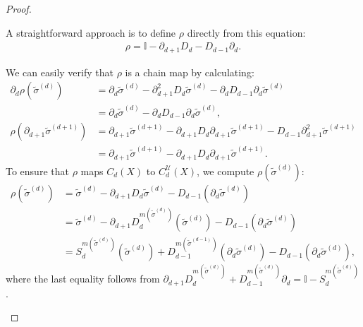 \begin{proof}
\begin{enumerate}
	A straightforward approach is to define \( \rho \) directly from this equation:
	\begin{align}
		\rho = \mathbb{I} - \partial_{d+1} D_{d} - D_{d-1} \partial_{d}. 
	\end{align}
		
	We can easily verify that \( \rho \) is a chain map by calculating:
	\begin{align}
		\partial_d \rho(\tilde{\sigma}^{(d)}) & = \partial_d \tilde{\sigma}^{(d)} - \partial^2_{d+1} D_d\tilde{\sigma}^{(d)} - \partial_{d} D_{d-1} \partial_d \tilde{\sigma}^{(d)} \nonumber\\
											  &	= \partial_d \tilde{\sigma}^{(d)} - \partial_d D_{d-1} \partial_d \tilde{\sigma}^{(d)},  \\
		\rho(\partial_{d+1} \tilde{\sigma}^{(d+1)}) & = \partial_{d+1} \tilde{\sigma}^{(d+1)} - \partial_{d+1} D_{d} \partial_{d+1} \tilde{\sigma}^{(d+1)} - D_{d-1} \partial^2_{d+1} \tilde{\sigma}^{(d+1)} \nonumber\\
													& = \partial_{d+1} \tilde{\sigma}^{(d+1)} - \partial_{d+1} D_{d} \partial_{d+1} \tilde{\sigma}^{(d+1)}. 
	\end{align}
	To ensure that \( \rho \) maps \( C_d(X) \) to \( C_d^{\mathcal{U}}(X) \), we compute \( \rho(\tilde{\sigma}^{(d)}) \):
	\begin{align}
		\rho(\tilde{\sigma}^{(d)}) & = \tilde{\sigma}^{(d)} - \partial_{d+1} D_d\tilde{\sigma}^{(d)} - D_{d-1}(\partial_d \tilde{\sigma}^{(d)}) \nonumber                                                 \\
		                           & = \tilde{\sigma}^{(d)} - \partial_{d+1} D^{m(\tilde{\sigma}^{(d)})}_d(\tilde{\sigma}^{(d)}) - D_{d-1}(\partial_d \tilde{\sigma}^{(d)}) \nonumber                     \\
		                           & = S^{m(\tilde{\sigma}^{(d)})}_d(\tilde{\sigma}^{(d)}) + D_{d-1}^{m(\tilde{\sigma}^{(d-1)})}(\partial_d \tilde{\sigma}^{(d)}) - D_{d-1}(\partial_d \tilde{\sigma}^{(d)}), 
	\end{align}
	where the last equality follows from \( \partial_{d+1} D_d^{m(\tilde{\sigma}^{(d)})} + D_{d-1}^{m(\tilde{\sigma}^{(d)})} \partial_d = \mathbb{I} - S^{m(\tilde{\sigma}^{(d)})}_d \).
		

\end{enumerate}
\end{proof}
